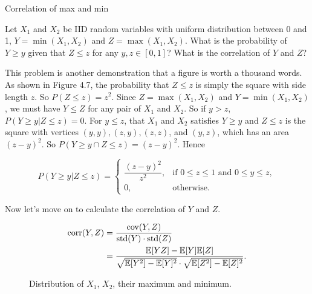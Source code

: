 \begin{problem}{Correlation of max and min}

Let $X_1$ and $X_2$ be IID random variables with uniform distribution between 0 and 1,
$Y=\min(X_1,X_2)$ and $Z=\max(X_1,X_2)$. What is the probability of $Y\geq y$ given
that $Z\leq z$ for any $y,z\in[0,1]$? What is the correlation of $Y$ and $Z$?

\end{problem}
\begin{solution}
This problem is another demonstration that a figure is worth a thousand words. As
shown in Figure 4.7, the probability that $Z\leq z$ is simply the square with side length
$z$. So $P(Z\leq z)=z^2$. Since $Z=\max(X_1,X_2)$ and $Y=\min(X_1,X_2)$, we must
have $Y\leq Z$ for any pair of $X_1$ and $X_2$. So if $y>z$,
$P(Y\geq y\vert Z\leq z)=0$. For $y\leq z$, that $X_1$ and $X_2$ satisfies $Y\geq y$
and $Z\leq z$ is the square with vertices $(y,y),(z,y),(z,z)$, and $(y,z)$, which has
an area $(z-y)^2$. So $P(Y\geq y\cap Z\leq z)=(z-y)^2$. Hence

\[
P(Y\geq y\vert Z\leq z)=
\begin{cases}
\dfrac{(z-y)^2}{z^2}, & \text{if }0\leq z\leq1\text{ and }0\leq y\leq z,\\
0, & \text{otherwise}.
\end{cases}
\]

Now let's move on to calculate the correlation of $Y$ and $Z$.

\[
\begin{aligned}
\operatorname{corr}(Y,Z)&=\frac{\operatorname{cov}(Y,Z)}{\operatorname{std}(Y)\cdot\operatorname{std}(Z)}\\
&=\frac{\mathbb{E}[YZ]-\mathbb{E}[Y]\mathbb{E}[Z]}{\sqrt{\mathbb{E}[Y^2]-\mathbb{E}[Y]^2}\cdot\sqrt{\mathbb{E}[Z^2]-\mathbb{E}[Z]^2}}.
\end{aligned}
\]


\begin{figure}[ht]
\centering
{}
\caption{Distribution of $X_1$, $X_2$, their maximum and minimum.}
\label{fig:zhou-figure-4-7}
\end{figure}


\end{solution}
